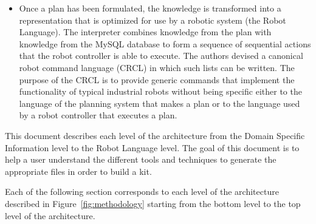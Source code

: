 \begin{itemize}
\item Once a plan has been formulated, the knowledge is transformed into a
representation that is optimized for use by a robotic system (the Robot
Language). The interpreter combines knowledge from the plan with knowledge
from the MySQL database to form a sequence of sequential actions that the
robot controller is able to execute. The authors devised a canonical robot
command language (CRCL) in which such lists can be written. The purpose of
the CRCL is to provide generic commands that implement the functionality of
typical industrial robots without being specific either to the language of
the planning system that makes a plan or to the language used by a robot
controller that executes a plan.
\end{itemize} 

This document describes each level of the architecture from the Domain Specific Information level to the Robot Language level. The goal of this document is to help a user understand the different tools and techniques to generate the appropriate files in order to build a kit.

Each of the following section corresponds to each level of the architecture described in Figure~\ref{fig:methodology} starting from the bottom level to the top level of the architecture.